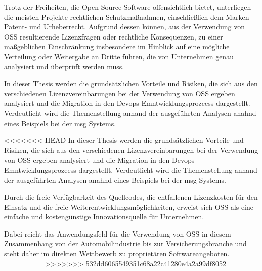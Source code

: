 Trotz der Freiheiten, die Open Source Software offensichtlich bietet, unterliegen die meisten Projekte rechtlichen Schutzmaßnahmen, einschließlich dem Marken- Patent- und Urheberrecht.
Aufgrund dessen können, aus der Verwendung von OSS resultierende Lizenzfragen oder rechtliche Konsequenzen, zu einer maßgeblichen Einschränkung insbesondere im Hinblick auf eine mögliche Verteilung oder Weitergabe an Dritte führen, die von Unternehmen genau analysiert und überprüft werden muss.  

In dieser Thesis werden die grundsätzlichen Vorteile und Risiken, die sich aus den verschiedenen Lizenzvereinbarungen bei der Verwendung von OSS ergeben analysiert und die Migration in den Devops-Emntwicklungsprozeess dargestellt.
Verdeutlicht wird die Themenstellung anhand der ausgeführten Analysen anahnd eines Beispiels bei der msg Systems.

<<<<<<< HEAD
In dieser Thesis werden die grundsätzlichen Vorteile und Risiken, die sich aus den verschiedenen Lizenzvereinbarungen bei der Verwendung von OSS ergeben analysiert und die Migration in den Devops-Emntwicklungsprozeess dargestellt. Verdeutlicht wird die Themenstellung anhand der ausgeführten Analysen anahnd eines Beispiels bei der msg Systems. 




Durch die freie Verfügbarkeit des Quellcodes, die entfallenen Lizenzkosten für den Einsatz und die freie Weiterentwicklungsmöglichkeiten, erweist sich OSS als eine einfache und kostengünstige Innovationsquelle für Unternehmen. 

Dabei reicht das Anwendungsfeld für die Verwendung von OSS in diesem Zusammenhang von der Automobilindustrie bis zur Versicherungsbranche und steht daher im direkten Wettbewerb zu proprietären Softwareangeboten. 
=======
>>>>>>> 532dd6065549351c68a22c41280e4a2a99df8052
